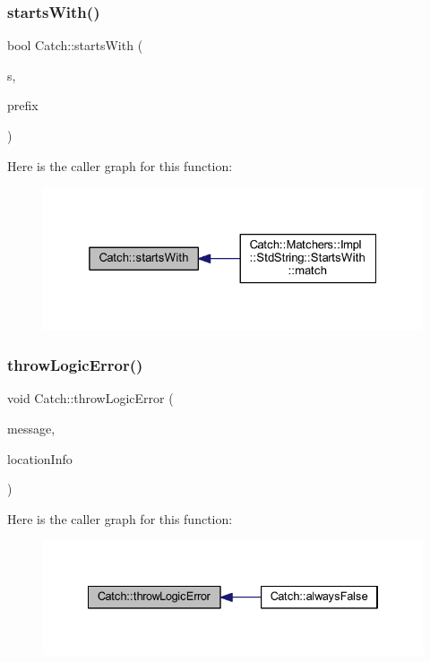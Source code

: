 \subsubsection{\texorpdfstring{starts\+With()}{startsWith()}}
{\footnotesize\ttfamily bool Catch\+::starts\+With (\begin{DoxyParamCaption}\item[{std\+::string const \&}]{s,  }\item[{std\+::string const \&}]{prefix }\end{DoxyParamCaption})}

Here is the caller graph for this function\+:\nopagebreak
\begin{figure}[H]
\begin{center}
\leavevmode
\includegraphics[width=325pt]{namespace_catch_a695f62327be0676e046291eeaae15110_icgraph}
\end{center}
\end{figure}
\hypertarget{namespace_catch_a702b612f683d154c466ea8297ed4a20d}{}\label{namespace_catch_a702b612f683d154c466ea8297ed4a20d} 
\subsubsection{\texorpdfstring{throw\+Logic\+Error()}{throwLogicError()}}
{\footnotesize\ttfamily void Catch\+::throw\+Logic\+Error (\begin{DoxyParamCaption}\item[{std\+::string const \&}]{message,  }\item[{\hyperlink{struct_catch_1_1_source_line_info}{Source\+Line\+Info} const \&}]{location\+Info }\end{DoxyParamCaption})}

Here is the caller graph for this function\+:\nopagebreak
\begin{figure}[H]
\begin{center}
\leavevmode
\includegraphics[width=334pt]{namespace_catch_a702b612f683d154c466ea8297ed4a20d_icgraph}
\end{center}
\end{figure}
\hypertarget{namespace_catch_ac036a17412d318598ffda8e1fe7a1177}{}\label{namespace_catch_ac036a17412d318598ffda8e1fe7a1177} 

